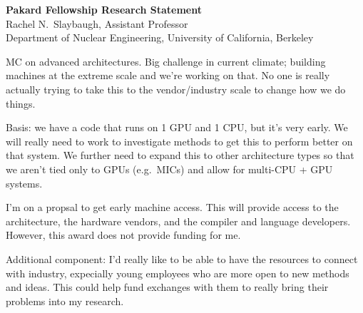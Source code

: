 \documentclass{proposalnsf}
\begin{document}
\begin{center}

\textbf{Pakard Fellowship Research Statement}\\
Rachel N.\ Slaybaugh, Assistant Professor\\
Department of Nuclear Engineering, University of California, Berkeley

\end{center}

MC on advanced architectures. Big challenge in current climate; building machines
at the extreme scale and we're working on that. No one is really actually trying
to take this to the vendor/industry scale to change how we do things. 

Basis: we have a code that runs on 1 GPU and 1 CPU, but it's very early. We 
will really need to work to investigate methods to get this to perform better on
that system. We further need to expand this to other architecture types so that
we aren't tied only to GPUs (e.g.\ MICs) and allow for multi-CPU + GPU systems.

I'm on a propsal to get early machine access. This will provide access to the 
architecture, the hardware vendors, and the compiler and language developers.
However, this award does not provide funding for me. 

Additional component: I'd really like to be able to have the resources to 
connect with industry, expecially young employees who are more open to new 
methods and ideas. This could help fund exchanges with them to really bring
their problems into my research.
\end{document}
